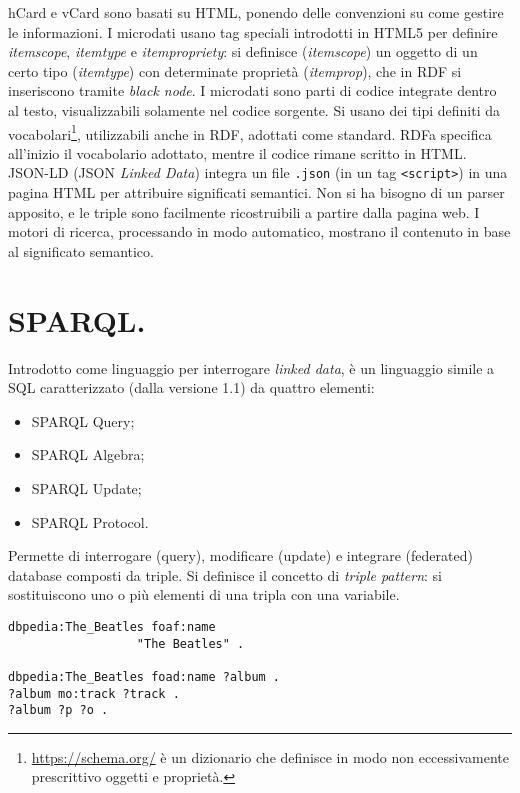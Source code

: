\documentclass[11pt, twocolumn]{article}
\begin{document}
hCard e vCard sono basati su HTML, ponendo delle convenzioni su come gestire le informazioni. \newline
I microdati usano tag speciali introdotti in HTML5 per definire \textit{itemscope}, \textit{itemtype} e \textit{itempropriety}: si definisce (\textit{itemscope}) un oggetto di un certo tipo (\textit{itemtype}) con determinate proprietà (\textit{itemprop}), che in RDF si inseriscono tramite \textit{black node}.
I microdati sono parti di codice integrate dentro al testo, visualizzabili solamente nel codice sorgente.
Si usano dei tipi definiti da vocabolari\footnote{\url{https://schema.org/} è un dizionario che definisce in modo non eccessivamente prescrittivo oggetti e proprietà.}, utilizzabili anche in RDF, adottati come standard. \newline
RDFa specifica all'inizio il vocabolario adottato, mentre il codice rimane scritto in HTML. \newline
JSON-LD (JSON \textit{Linked Data}) integra un file \verb|.json| (in un tag \verb|<script>|) in una pagina HTML per attribuire significati semantici.
Non si ha bisogno di un parser apposito, e le triple sono facilmente ricostruibili a partire dalla pagina web.
I motori di ricerca, processando in modo automatico, mostrano il contenuto in base al significato semantico.

\section{SPARQL.}
Introdotto come linguaggio per interrogare \textit{linked data}, è un linguaggio simile a SQL caratterizzato (dalla versione 1.1) da quattro elementi:
\begin{itemize}
  \item SPARQL Query;
  \item SPARQL Algebra;
  \item SPARQL Update;
  \item SPARQL Protocol.
\end{itemize}
Permette di interrogare (query), modificare (update) e integrare (federated) database composti da triple.
Si definisce il concetto di \textit{triple pattern}: si sostituiscono uno o più elementi di una tripla con una variabile.

\begin{verbatim}
dbpedia:The_Beatles foaf:name
                  "The Beatles" .

dbpedia:The_Beatles foad:name ?album .
?album mo:track ?track .
?album ?p ?o .
\end{verbatim}
\end{document}
